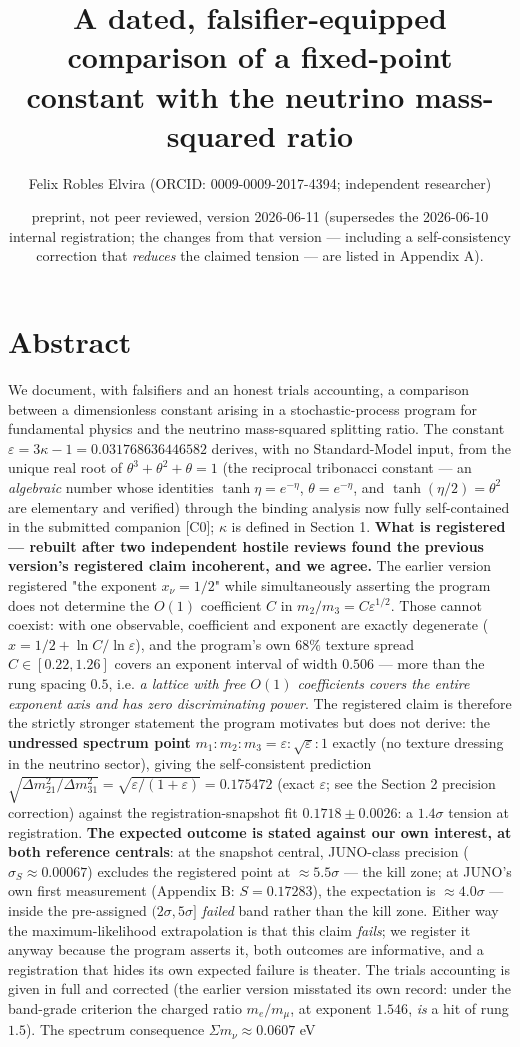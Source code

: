 \documentclass[11pt]{article}
\title{A dated, falsifier-equipped comparison of a fixed-point constant with the neutrino mass-squared ratio}
\author{Felix Robles Elvira (ORCID: 0009-0009-2017-4394; independent researcher)}
\date{\small preprint, not peer reviewed, version 2026-06-11 (supersedes the 2026-06-10 internal registration; the changes from that version — including a self-consistency correction that \emph{reduces} the claimed tension — are listed in Appendix A).}
\begin{document}
\maketitle

\section*{Abstract}
We document, with falsifiers and an honest trials accounting, a comparison between a dimensionless constant arising in a stochastic-process program for fundamental physics and the neutrino mass-squared splitting ratio.  The constant $\varepsilon = 3\kappa - 1 = 0.031768636446582$ derives, with no Standard-Model input, from the unique real root of $\theta^3 + \theta^2 + \theta = 1$ (the reciprocal tribonacci constant — an \emph{algebraic} number whose identities $\tanh\eta = e^{-\eta}$, $\theta = e^{-\eta}$, and $\tanh(\eta/2) = \theta^2$ are elementary and verified) through the binding analysis now fully self-contained in the submitted companion [C0]; $\kappa$ is defined in Section 1. \textbf{What is registered — rebuilt after two independent hostile reviews found the previous version's registered claim incoherent, and we agree.}  The earlier version registered "the exponent $x_\nu = 1/2$" while simultaneously asserting the program does not determine the $O(1)$ coefficient $C$ in $m_2/m_3 = C\varepsilon^{1/2}$.  Those cannot coexist: with one observable, coefficient and exponent are exactly degenerate ($x = 1/2 + \ln C/\ln\varepsilon$), and the program's own $68\%$ texture spread $C \in [0.22, 1.26]$ covers an exponent interval of width $0.506$ — more than the rung spacing $0.5$, i.e. \emph{a lattice with free $O(1)$ coefficients covers the entire exponent axis and has zero discriminating power}.  The registered claim is therefore the strictly stronger statement the program motivates but does not derive: the \textbf{undressed spectrum point} $m_1 : m_2 : m_3 = \varepsilon : \sqrt\varepsilon : 1$ exactly (no texture dressing in the neutrino sector), giving the self-consistent prediction $\sqrt{\Delta m^2_{21}/\Delta m^2_{31}} = \sqrt{\varepsilon/(1+\varepsilon)} = 0.175472$ (exact $\varepsilon$; see the Section 2 precision correction) against the registration-snapshot fit $0.1718 \pm 0.0026$: a $1.4\sigma$ tension at registration.  \textbf{The expected outcome is stated against our own interest, at both reference centrals}: at the snapshot central, JUNO-class precision ($\sigma_S \approx 0.00067$) excludes the registered point at $\approx 5.5\sigma$ — the kill zone; at JUNO's own first measurement (Appendix B: $S = 0.17283$), the expectation is $\approx 4.0\sigma$ — inside the pre-assigned $(2\sigma, 5\sigma]$ \emph{failed} band rather than the kill zone. Either way the maximum-likelihood extrapolation is that this claim \emph{fails}; we register it anyway because the program asserts it, both outcomes are informative, and a registration that hides its own expected failure is theater.  The trials accounting is given in full and corrected (the earlier version misstated its own record: under the band-grade criterion the charged ratio $m_e/m_\mu$, at exponent $1.546$, \emph{is} a hit of rung $1.5$).  The spectrum consequence $\Sigma m_\nu \approx 0.0607$ eV 
\end{document}
